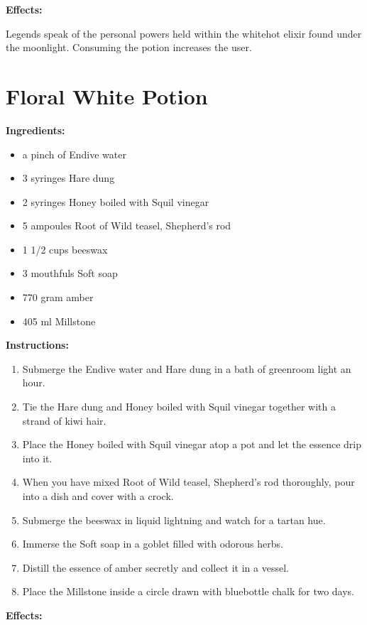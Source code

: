 \documentclass{article}
\begin{document}
\textbf{Effects:}

Legends speak of the personal powers held within the whitehot elixir found under the moonlight. Consuming the potion increases the user.

\newpage
\section*{Floral White Potion}

\textbf{Ingredients:}

\begin{itemize}
  \item a pinch of Endive water
  \item 3 syringes Hare dung
  \item 2 syringes Honey boiled with  Squil vinegar
  \item 5 ampoules Root of Wild teasel, Shepherd's rod
  \item 1 1/2 cups beeswax
  \item 3 mouthfuls Soft soap
  \item 770 gram amber
  \item 405 ml Millstone
\end{itemize}

\textbf{Instructions:}

\begin{enumerate}
  \item Submerge the Endive water and Hare dung in a bath of greenroom light an hour.
  \item Tie the Hare dung and Honey boiled with  Squil vinegar together with a strand of kiwi hair.
  \item Place the Honey boiled with  Squil vinegar atop a pot and let the essence drip into it.
  \item When you have mixed Root of Wild teasel, Shepherd's rod thoroughly, pour into a dish and cover with a crock.
  \item Submerge the beeswax in liquid lightning and watch for a tartan hue.
  \item Immerse the Soft soap in a goblet filled with odorous herbs.
  \item Distill the essence of amber secretly and collect it in a vessel.
  \item Place the Millstone inside a circle drawn with bluebottle chalk for two days.
\end{enumerate}

\textbf{Effects:}
\end{document}
